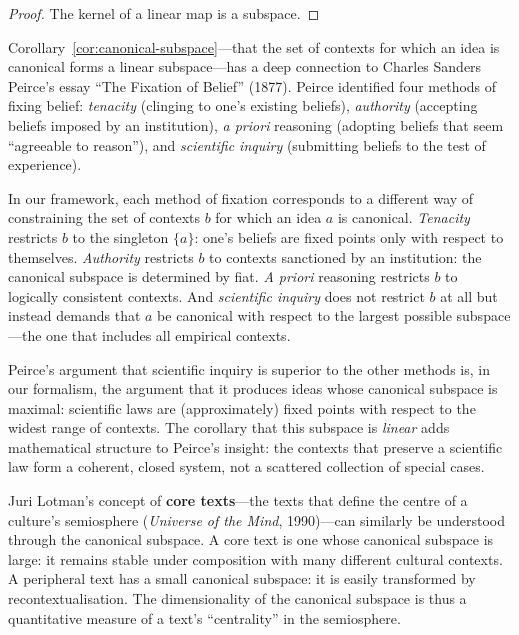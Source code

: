 \begin{proof}
The kernel of a linear map is a subspace.
\end{proof}

\begin{interpretation}
\label{interp:ch10:peirce_fixation}
Corollary~\ref{cor:canonical-subspace}---that the set of contexts for which
an idea is canonical forms a linear subspace---has a deep connection to
Charles Sanders Peirce's essay ``The Fixation of Belief'' (1877).  Peirce
identified four methods of fixing belief: \emph{tenacity} (clinging to one's
existing beliefs), \emph{authority} (accepting beliefs imposed by an
institution), \emph{a priori} reasoning (adopting beliefs that seem
``agreeable to reason''), and \emph{scientific inquiry} (submitting beliefs
to the test of experience).

In our framework, each method of fixation corresponds to a different way of
constraining the set of contexts $b$ for which an idea $a$ is canonical.
\emph{Tenacity} restricts $b$ to the singleton $\{a\}$: one's beliefs are
fixed points only with respect to themselves.  \emph{Authority} restricts $b$
to contexts sanctioned by an institution: the canonical subspace is
determined by fiat.  \emph{A priori} reasoning restricts $b$ to logically
consistent contexts.  And \emph{scientific inquiry} does not restrict $b$ at
all but instead demands that $a$ be canonical with respect to the largest
possible subspace---the one that includes all empirical contexts.

Peirce's argument that scientific inquiry is superior to the other methods is,
in our formalism, the argument that it produces ideas whose canonical subspace
is maximal: scientific laws are (approximately) fixed points with respect to
the widest range of contexts.  The corollary that this subspace is \emph{linear}
adds mathematical structure to Peirce's insight: the contexts that preserve a
scientific law form a coherent, closed system, not a scattered collection of
special cases.

Juri Lotman's concept of \textbf{core texts}---the texts that define the
centre of a culture's semiosphere (\emph{Universe of the Mind}, 1990)---can
similarly be understood through the canonical subspace.  A core text is one
whose canonical subspace is large: it remains stable under composition with
many different cultural contexts.  A peripheral text has a small canonical
subspace: it is easily transformed by recontextualisation.  The
dimensionality of the canonical subspace is thus a quantitative measure of
a text's ``centrality'' in the semiosphere.
\end{interpretation}




